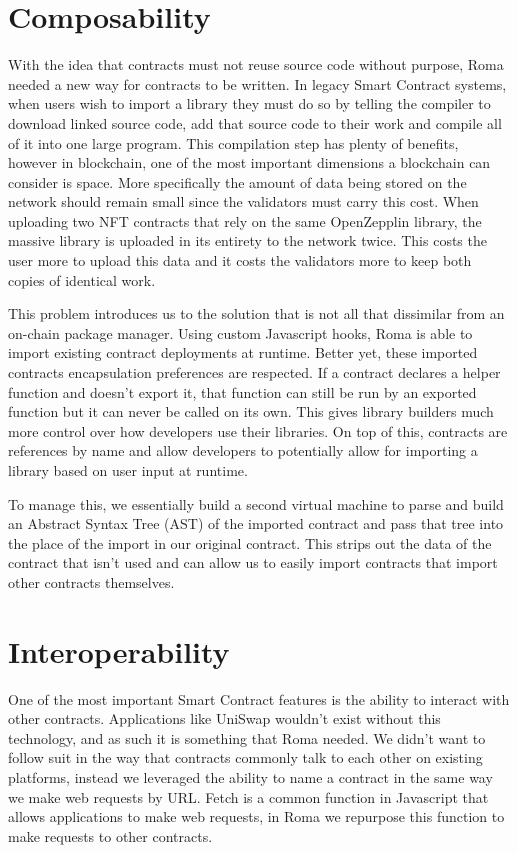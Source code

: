 \documentclass[a4paper]{article}
\begin{document}
\section{Composability}
With the idea that contracts must not reuse source code without purpose, Roma needed a new way for contracts to be written. In legacy Smart Contract systems, when users wish to import a library they must do so by telling the compiler to download linked source code, add that source code to their work and compile all of it into one large program. This compilation step has plenty of benefits, however in blockchain, one of the most important dimensions a blockchain can consider is space. More specifically the amount of data being stored on the network should remain small since the validators must carry this cost. When uploading two NFT contracts that rely on the same OpenZepplin library, the massive library is uploaded in its entirety to the network twice. This costs the user more to upload this data and it costs the validators more to keep both copies of identical work.

This problem introduces us to the solution that is not all that dissimilar from an on-chain package manager. Using custom Javascript hooks, Roma is able to import existing contract deployments at runtime. Better yet, these imported contracts encapsulation preferences are respected. If a contract declares a helper function and doesn’t export it, that function can still be run by an exported function but it can never be called on its own. This gives library builders much more control over how developers use their libraries. On top of this, contracts are references by name and allow developers to potentially allow for importing a library based on user input at runtime.

To manage this, we essentially build a second virtual machine to parse and build an Abstract Syntax Tree (AST) of the imported contract and pass that tree into the place of the import in our original contract. This strips out the data of the contract that isn’t used and can allow us to easily import contracts that import other contracts themselves.

\section{Interoperability}
One of the most important Smart Contract features is the ability to interact with other contracts. Applications like UniSwap wouldn’t exist without this technology, and as such it is something that Roma needed. We didn’t want to follow suit in the way that contracts commonly talk to each other on existing platforms, instead we leveraged the ability to name a contract in the same way we make web requests by URL. Fetch is a common function in Javascript that allows applications to make web requests, in Roma we repurpose this function to make requests to other contracts.
\end{document}
